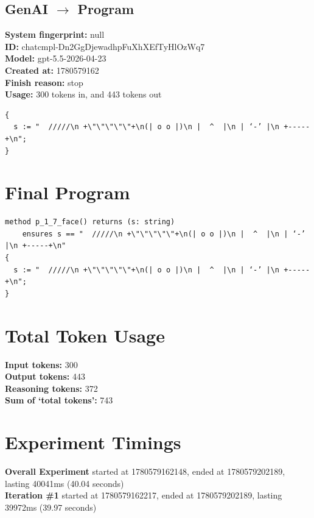 \documentclass{article}
\begin{document}
\subsection*{GenAI $\rightarrow$ Program}
\textbf{System fingerprint: }null
\\\textbf{ID: }chatcmpl-Dn2GgDjewadhpFuXhXEfTyHlOzWq7
\\\textbf{Model: }gpt-5.5-2026-04-23
\\\textbf{Created at: }1780579162
\\\textbf{Finish reason: }stop
\\\textbf{Usage: }300 tokens in, and 443 tokens out
\begin{lstlisting}
{
  s := "  /////\n +\"\"\"\"\"+\n(| o o |)\n |  ^  |\n | ‘-’ |\n +-----+\n";
}
\end{lstlisting}
\section*{Final Program}
\begin{lstlisting}
method p_1_7_face() returns (s: string)
	ensures s == "  /////\n +\"\"\"\"\"+\n(| o o |)\n |  ^  |\n | ‘-’ |\n +-----+\n"
{
  s := "  /////\n +\"\"\"\"\"+\n(| o o |)\n |  ^  |\n | ‘-’ |\n +-----+\n";
}
\end{lstlisting}
\section*{Total Token Usage}
\textbf{Input tokens: }300
\\\textbf{Output tokens: }443
\\\textbf{Reasoning tokens: }372
\\\textbf{Sum of `total tokens': }743
\section*{Experiment Timings}
\textbf{Overall Experiment} started at 1780579162148, ended at 1780579202189, lasting 40041ms (40.04 seconds)
\\\textbf{Iteration \#1} started at 1780579162217, ended at 1780579202189, lasting 39972ms (39.97 seconds)
\end{document}
